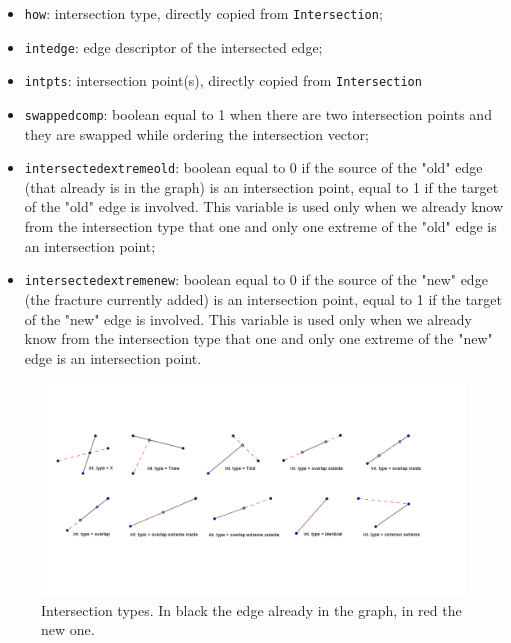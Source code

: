 \documentclass[10pt]{article} %
\begin{document}
	\begin{itemize}
		\item \texttt{how}: intersection type, directly copied from \texttt{Intersection};
		\item \texttt{int\textunderscore edge}: edge descriptor of the intersected edge;
		\item \texttt{int\textunderscore pts}: intersection point(s), directly copied from \texttt{Intersection}
		\item \texttt{swapped\textunderscore comp}: boolean equal to 1 when there are two intersection points and they are swapped while ordering the intersection vector;
		\item \texttt{intersected\textunderscore extreme\textunderscore old}: boolean equal to 0 if the source of the "old" edge (that already is in the graph) is an intersection point, equal to 1 if the target of the "old" edge is involved. This variable is used only when we already know from the intersection type that one and only one extreme of the "old" edge is an intersection point;
		\item \texttt{intersected\textunderscore extreme\textunderscore new}: boolean equal to 0 if the source of the "new" edge (the fracture currently added) is an intersection point, equal to 1 if the target of the "new" edge is involved. This variable is used only when we already know from the intersection type that one and only one extreme of the "new" edge is an intersection point.
	\end{itemize}
	
	\begin{figure}
		\centering 
		\includegraphics[width=1\textwidth]{"int_type"}
		\caption{Intersection types. In black the edge already in the graph, in red the new one.}
		\label{fig:frac_int_type}
	\end{figure}
\end{document}
